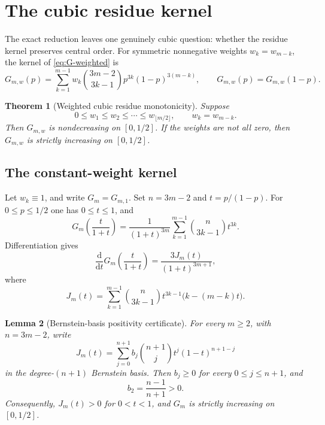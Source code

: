 \documentclass[11pt,a4paper]{amsart}
\numberwithin{equation}{section}
\theoremstyle{plain}
\newtheorem{theorem}{Theorem}[section]
\newtheorem{lemma}[theorem]{Lemma}
\theoremstyle{definition}
\begin{document}
\section{The cubic residue kernel}\label{sec:kernel}

The exact reduction leaves one genuinely cubic question: whether the residue kernel
preserves central order.  For symmetric nonnegative weights \(w_k=w_{m-k}\), the kernel of
\eqref{eq:G-weighted} is
\[
 G_{m,w}(p)=\sum_{k=1}^{m-1}w_k\binom{3m-2}{3k-1}
 p^{3k}(1-p)^{3(m-k)},
 \qquad G_{m,w}(p)=G_{m,w}(1-p).
\]

\begin{theorem}[Weighted cubic residue monotonicity]\label{thm:kernel}
Suppose
\begin{equation}\label{eq:w-monotone}
 0\le w_1\le w_2\le\cdots\le w_{\lfloor m/2\rfloor},
 \qquad w_k=w_{m-k}.
\end{equation}
Then \(G_{m,w}\) is nondecreasing on \([0,1/2]\).  If the weights are not all zero,
then \(G_{m,w}\) is strictly increasing on \([0,1/2]\).
\end{theorem}

\subsection{The constant-weight kernel}\label{subsec:constant-weight-kernel}

Let \(w_k\equiv1\), and write \(G_m=G_{m,1}\).  Set \(n=3m-2\) and \(t=p/(1-p)\).
For \(0\le p\le1/2\) one has \(0\le t\le1\), and
\[
 G_m\!\left(\frac{t}{1+t}\right)
 =\frac{1}{(1+t)^{3m}}
 \sum_{k=1}^{m-1}\binom{n}{3k-1}t^{3k}.
\]
Differentiation gives
\begin{equation}\label{eq:G-J}
 \frac{\mathrm d}{\mathrm d t}G_m\!\left(\frac{t}{1+t}\right)
 =\frac{3J_m(t)}{(1+t)^{3m+1}},
\end{equation}
where
\begin{equation}\label{eq:J-k}
 J_m(t)=\sum_{k=1}^{m-1}\binom{n}{3k-1}t^{3k-1}
 \bigl(k-(m-k)t\bigr).
\end{equation}

\begin{lemma}[Bernstein-basis positivity certificate]\label{lem:bernstein}
For every \(m\ge2\), with \(n=3m-2\), write
\[
 J_m(t)=\sum_{j=0}^{n+1}b_j\binom{n+1}{j}t^j(1-t)^{n+1-j}
\]
in the degree-\((n+1)\) Bernstein basis.  Then \(b_j\ge0\) for every
\(0\le j\le n+1\), and
\[
 b_2=\frac{n-1}{n+1}>0.
\]
Consequently, \(J_m(t)>0\) for \(0<t<1\), and \(G_m\) is strictly increasing on
\([0,1/2]\).
\end{lemma}
\end{document}
